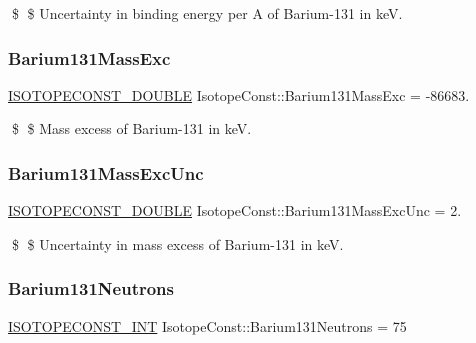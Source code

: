 \$ \$ Uncertainty in binding energy per A of Barium-\/131 in keV. \mbox{\label{group___isotope_const-_barium-_ba131_ga5391e092fd83069ec2b8cf212bec715c}} 
\subsubsection{\texorpdfstring{Barium131\+Mass\+Exc}{Barium131MassExc}}
{\footnotesize\ttfamily \mbox{\hyperlink{group___isotope_const-_macros_ga8f45a7272ce02c0b4c65c44636ed719a}{I\+S\+O\+T\+O\+P\+E\+C\+O\+N\+S\+T\+\_\+\+D\+O\+U\+B\+LE}} Isotope\+Const\+::\+Barium131\+Mass\+Exc = -\/86683.}

\$ \$ Mass excess of Barium-\/131 in keV. \mbox{\label{group___isotope_const-_barium-_ba131_ga5075c07f04bf677d34ece324b5a09f40}} 
\subsubsection{\texorpdfstring{Barium131\+Mass\+Exc\+Unc}{Barium131MassExcUnc}}
{\footnotesize\ttfamily \mbox{\hyperlink{group___isotope_const-_macros_ga8f45a7272ce02c0b4c65c44636ed719a}{I\+S\+O\+T\+O\+P\+E\+C\+O\+N\+S\+T\+\_\+\+D\+O\+U\+B\+LE}} Isotope\+Const\+::\+Barium131\+Mass\+Exc\+Unc = 2.}

\$ \$ Uncertainty in mass excess of Barium-\/131 in keV. \mbox{\label{group___isotope_const-_barium-_ba131_gab56e5e1fea2c675b40477dbea246a146}} 
\subsubsection{\texorpdfstring{Barium131\+Neutrons}{Barium131Neutrons}}
{\footnotesize\ttfamily \mbox{\hyperlink{group___isotope_const-_macros_ga5f18360b3e99483a35c32d789e62621c}{I\+S\+O\+T\+O\+P\+E\+C\+O\+N\+S\+T\+\_\+\+I\+NT}} Isotope\+Const\+::\+Barium131\+Neutrons = 75}

